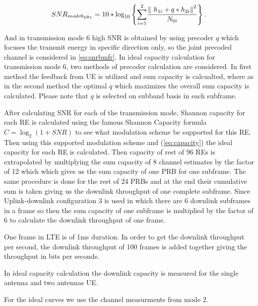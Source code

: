 \documentclass[a4paper,10pt]{article}
\begin{document}
\begin{equation} \label{eq:snrbmfr}
SNR_{mode6_{2Rx}} = 10* {\mathrm{log}}_{10} \left\lbrace {\sum_{i=1}^2} {\frac{{\| \ {h_{1i}} + q*{h_{2i}} \| \\}^2}{N_{0i}}}\right\rbrace. 
\end{equation}

And in transmission mode 6 high SNR is obtained by using precoder $q$ which focuses the transmit energy in specific direction only, so the joint precoded channel is considered in \ref{eq:snrbmfr}. In ideal capacity calculation for transmission mode 6, two methods of precoder calculation are considered. In first method the feedback from UE is utilized and sum capacity is calcualted, where as in the second method the optimal $q$ which maximizes the overall sum capacity is calculated. Please note that $q$ is selected on subband basis in each subframe.


After calculating SNR for each of the transmission mode, Shannon capacity for each RE is calculated using the famous Shannon Capacity formula $C = \log_2(1 + SNR)$ to see what modulation scheme be supported for this RE. Then using this supported modulation scheme and (\ref{eq:capacity}) the ideal capacity for each RE is calculated.
\newline
Then capacity of rest of 96 REs is extrapolated by multiplying the sum capacity of 8 channel estimates by the factor of 12 which which gives us the sum capacity of one PRB for one subframe. The same procedure is done for the rest of 24 PRBs and at the end their cumulative sum is taken giving us the downlink throughput of one complete subframe. Since Uplink-downlink configuration 3 is used in which there are 6 downlink subframes in a frame so then the sum capacity of one subframe is multiplied by the factor of 6 to calculate the downlink throughput of one frame. 

One frame in LTE is of 1ms duration. In order to get the downlink throughput per second, the downlink throughput of 100 frames is added together giving the throughput in bits per seconds.

In ideal capacity calculation the downlink capacity is measured for the single antenna and two antennas UE.  

For the ideal curves we use the channel measurments from mode 2.
\end{document}
